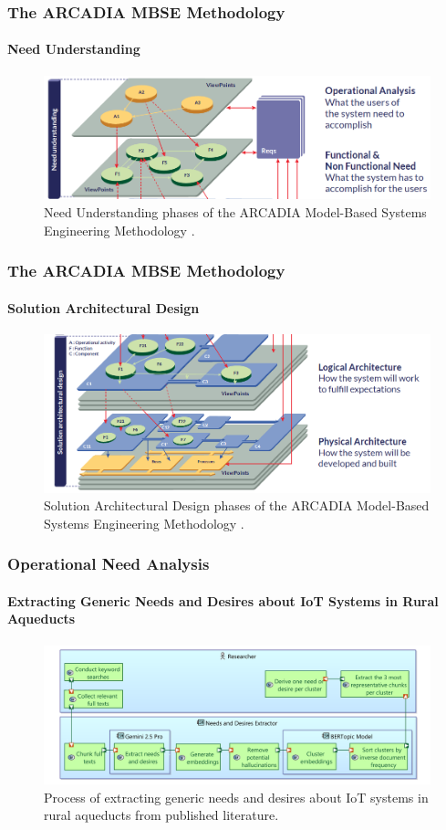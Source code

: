 \documentclass{beamer}
\begin{document}
\begin{frame}
    \frametitle{\small The ARCADIA MBSE Methodology}
    \framesubtitle{Need Understanding}

    \begin{figure}
        \centering
        \includegraphics[width=\textwidth]{images/phases_arcadia_1.png}
        \caption{Need Understanding phases of the ARCADIA Model-Based Systems Engineering Methodology \cite{Arcadia_phases}.}
    \end{figure}
\end{frame}

\begin{frame}
    \frametitle{\small The ARCADIA MBSE Methodology}
    \framesubtitle{Solution Architectural Design}

    \begin{figure}
        \centering
        \includegraphics[width=\textwidth]{images/phases_arcadia_2.png}
        \caption{Solution Architectural Design phases of the ARCADIA Model-Based Systems Engineering Methodology \cite{Arcadia_phases}.}
    \end{figure}
\end{frame}

\begin{frame}
    \frametitle{\small Operational Need Analysis}
    \framesubtitle{Extracting Generic Needs and Desires about IoT Systems in Rural Aqueducts}

    \begin{figure}
        \centering
        \includegraphics[width=\textwidth]{images/bertopic.png}
        \caption{Process of extracting generic needs and desires about IoT systems in rural aqueducts from published literature.}
    \end{figure}
\end{frame}
\end{document}
